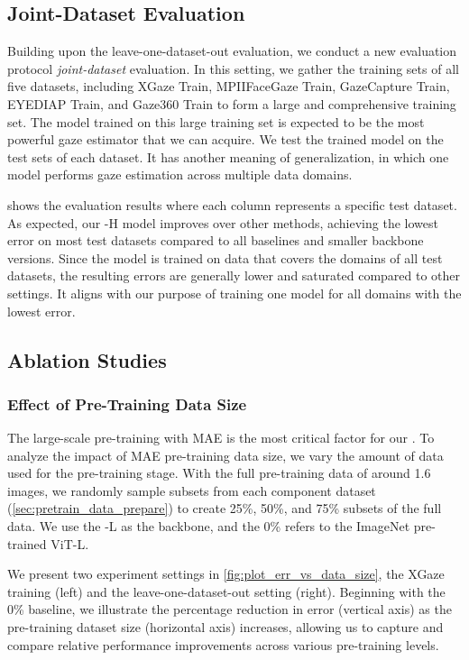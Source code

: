 \subsection{Joint-Dataset Evaluation}\label{sec:joint}



Building upon the leave-one-dataset-out evaluation, we conduct a new evaluation protocol \textit{joint-dataset} evaluation.
In this setting, we gather the training sets of all five datasets, including XGaze Train, MPIIFaceGaze Train, GazeCapture Train, EYEDIAP Train, and Gaze360 Train to form a large and comprehensive training set.
The model trained on this large training set is expected to be the most powerful gaze estimator that we can acquire.
We test the trained model on the test sets of each dataset.
It has another meaning of generalization, in which one model performs gaze estimation across multiple data domains.


 shows the evaluation results where each column represents a specific test dataset.
As expected, our \methodname-H model improves over other methods, achieving the lowest error on most test datasets compared to all baselines and smaller backbone versions.
Since the model is trained on data that covers the domains of all test datasets, the resulting errors are generally lower and saturated compared to other settings. 
It aligns with our purpose of training one model for all domains with the lowest error.


\subsection{Ablation Studies}\label{sec:ablation}

\subsubsection{Effect of Pre-Training Data Size}
The large-scale pre-training with MAE is the most critical factor for our \methodname. 
To analyze the impact of MAE pre-training data size, we vary the amount of data used for the pre-training stage. 
With the full pre-training data of around \SI{1.6}{\mega{}} images, we randomly sample subsets from each component dataset (\cref{sec:pretrain_data_prepare}) to create 25\%, 50\%, and 75\% subsets of the full data.
We use the \methodname-L as the backbone, and the 0\% refers to the ImageNet pre-trained ViT-L.


We present two experiment settings in \cref{fig:plot_err_vs_data_size}, the XGaze training (left) and the leave-one-dataset-out setting (right).
Beginning with the 0\% baseline, we illustrate the percentage reduction in error (vertical axis) as the pre-training dataset size (horizontal axis) increases, allowing us to capture and compare relative performance improvements across various pre-training levels.


